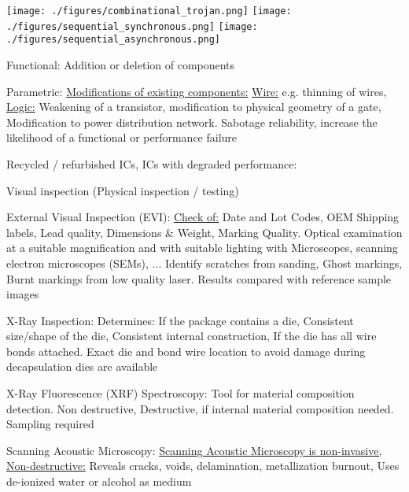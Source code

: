 \documentclass[landscape, a4paper]{article}
\begin{document}
\begin{minipage}[t]{0.2\linewidth}
\begin{betterlist}
\begin{betterlist}
\begin{betterlist}
				\texttt{[image: ./figures/combinational\_trojan.png]}
				\texttt{[image: ./figures/sequential\_synchronous.png]}
				\texttt{[image: ./figures/sequential\_asynchronous.png]}
				\item \alert{Functional:} Addition or deletion of components
				\item \alert{Parametric:} \underline{Modifications of existing components:} \underline{Wire:} e.g. thinning of wires, \underline{Logic:} Weakening of a transistor, modification to physical geometry of a gate, Modification to power distribution network. Sabotage reliability, increase the likelihood of a functional or performance failure
			\end{betterlist}
		\end{betterlist}
	\end{betterlist}
	\begin{betterlist}
		\item \alert{Recycled / refurbished ICs, ICs with degraded performance:}
		\begin{betterlist}
			\item \alert{Visual inspection (Physical inspection / testing)}
			\begin{betterlist}
				\item \alert{External Visual Inspection (EVI):} \underline{Check of:} Date and Lot Codes, OEM Shipping labels, Lead quality, Dimensions \& Weight, Marking Quality. Optical examination at a suitable magnification and with suitable lighting with Microscopes, scanning electron microscopes (SEMs), ... Identify scratches from sanding, Ghost markings, Burnt markings from low quality laser. Results compared with reference sample images
				\item \alert{X-Ray Inspection:} Determines: If the package contains a die, Consistent size/shape of the die, Consistent internal construction, If the die has all wire bonds attached. Exact die and bond wire location to avoid damage during decapsulation%
				dies are available
				\item \alert{X-Ray Fluorescence (XRF) Spectroscopy:} Tool for material composition detection. Non destructive, Destructive, if internal material composition needed. Sampling required
				\item \alert{Scanning Acoustic Microscopy:} \underline{Scanning Acoustic Microscopy is non-invasive, Non-destructive:} Reveals cracks, voids, delamination, metallization burnout, Uses de-ionized water or alcohol as medium

\end{betterlist}
\end{betterlist}
\end{betterlist}
\end{minipage}
\end{document}
